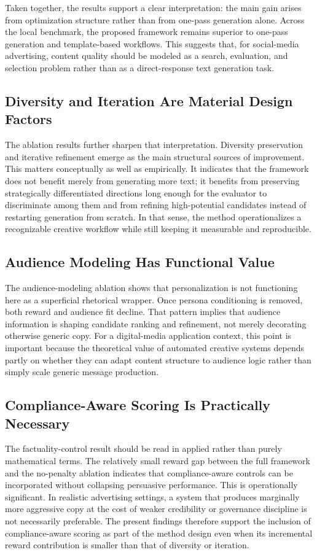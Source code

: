 \documentclass[applsci,article,submit,pdftex,moreauthors]{Definitions/mdpi}
\begin{document}
Taken together, the results support a clear interpretation: the main gain arises from optimization structure rather than from one-pass generation alone. Across the local benchmark, the proposed framework remains superior to one-pass generation and template-based workflows. This suggests that, for social-media advertising, content quality should be modeled as a search, evaluation, and selection problem rather than as a direct-response text generation task.

\subsection{Diversity and Iteration Are Material Design Factors}

The ablation results further sharpen that interpretation. Diversity preservation and iterative refinement emerge as the main structural sources of improvement. This matters conceptually as well as empirically. It indicates that the framework does not benefit merely from generating more text; it benefits from preserving strategically differentiated directions long enough for the evaluator to discriminate among them and from refining high-potential candidates instead of restarting generation from scratch. In that sense, the method operationalizes a recognizable creative workflow while still keeping it measurable and reproducible.

\subsection{Audience Modeling Has Functional Value}

The audience-modeling ablation shows that personalization is not functioning here as a superficial rhetorical wrapper. Once persona conditioning is removed, both reward and audience fit decline. That pattern implies that audience information is shaping candidate ranking and refinement, not merely decorating otherwise generic copy. For a digital-media application context, this point is important because the theoretical value of automated creative systems depends partly on whether they can adapt content structure to audience logic rather than simply scale generic message production.

\subsection{Compliance-Aware Scoring Is Practically Necessary}

The factuality-control result should be read in applied rather than purely mathematical terms. The relatively small reward gap between the full framework and the no-penalty ablation indicates that compliance-aware controls can be incorporated without collapsing persuasive performance. This is operationally significant. In realistic advertising settings, a system that produces marginally more aggressive copy at the cost of weaker credibility or governance discipline is not necessarily preferable. The present findings therefore support the inclusion of compliance-aware scoring as part of the method design even when its incremental reward contribution is smaller than that of diversity or iteration.
\end{document}
